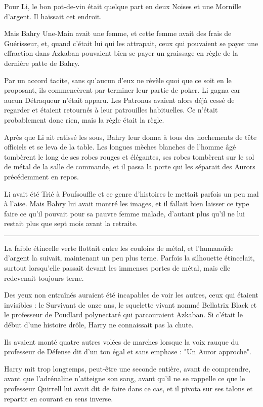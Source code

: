 Pour Li, le bon pot-de-vin était quelque part en deux Noises et une Mornille d'argent. Il haïssait cet endroit.

Mais Bahry Une-Main avait une femme, et cette femme avait des frais de Guérisseur, et, quand c'était lui qui les attrapait, ceux qui pouvaient se payer une effraction dans Azkaban pouvaient bien se payer un graissage en règle de la dernière patte de Bahry.

Par un accord tacite, sans qu'aucun d'eux ne révèle quoi que ce soit en le proposant, ils commencèrent par terminer leur partie de poker. Li gagna car aucun Détraqueur n'était apparu. Les Patronus avaient alors déjà cessé de regarder et étaient retournés à leur patrouilles habituelles. Ce n'était probablement donc rien, mais la règle était la règle.

Après que Li ait ratissé les sous, Bahry leur donna à tous des hochements de tête officiels et se leva de la table. Les longues mèches blanches de l'homme âgé tombèrent le long de ses robes rouges et élégantes, ses robes tombèrent sur le sol de métal de la salle de commande, et il passa la porte qui les séparait des Aurors précédemment en repos.

Li avait été Trié à Poufsouffle et ce genre d'histoires le mettait parfois un peu mal à l'aise. Mais Bahry lui avait montré les images, et il fallait bien laisser ce type faire ce qu'il pouvait pour sa pauvre femme malade, d'autant plus qu'il ne lui restait plus que sept mois avant la retraite.
\par\noindent\rule{\textwidth}{0.4pt}
La faible étincelle verte flottait entre les couloirs de métal, et l'humanoïde d'argent la suivait, maintenant un peu plus terne. Parfois la silhouette étincelait, surtout lorsqu'elle passait devant les immenses portes de métal, mais elle redevenait toujours terne.

Des yeux non entraînés auraient été incapables de voir les autres, ceux qui étaient invisibles : le Survivant de onze ans, le squelette vivant nommé Bellatrix Black et le professeur de Poudlard polynectaré qui parcouraient Azkaban. Si c'était le début d'une histoire drôle, Harry ne connaissait pas la chute.

Ils avaient monté quatre autres volées de marches lorsque la voix rauque du professeur de Défense dit d'un ton égal et sans emphase : "Un Auror approche".

Harry mit trop longtemps, peut-être une seconde entière, avant de comprendre, avant que l'adrénaline n'atteigne son sang, avant qu'il ne se rappelle ce que le professeur Quirrell lui avait dit de faire dans ce cas, et il pivota sur ses talons et repartit en courant en sens inverse.

